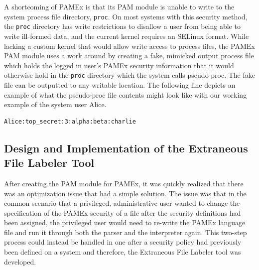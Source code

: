 A shortcoming of PAMEx is that 
its PAM module is unable to write to the system process file directory, 
\texttt{proc}. On most systems with this security method, the \texttt{proc} directory 
has write restrictions to disallow a user from being able to write ill-formed data,
and the current kernel requires an SELinux format. While lacking a custom kernel 
that would allow write access to process files, the PAMEx PAM module 
uses a work around by creating a fake, mimicked output process file 
which holds the logged in user’s PAMEx security information that it 
would otherwise hold in the \texttt{proc} directory which the system calls 
pseudo-proc. The fake file can be outputted to any writable location. 
The following line depicts an example of what the pseudo-proc file contents might look like with our 
working example of the system user Alice. 

\begin{verbatim}
Alice:top_secret:3:alpha:beta:charlie
\end{verbatim}

\vspace{\baselineskip}

\subsection{Design and Implementation of the Extraneous File Labeler Tool}
\par 
\vspace{\baselineskip}
\hspace{1em}
After creating the PAM module for PAMEx, it was quickly realized 
that there was an optimization issue that had a simple solution. The 
issue was that in the common scenario that a privileged, administrative 
user wanted to change the specification of the PAMEx security of a file 
after the security definitions had been assigned, the privileged user 
would need to re-write the PAMEx language file and run it through both 
the parser and the interpreter again. This two-step process could 
instead be handled in one after a security policy had previously been defined on a system and 
therefore, the Extraneous File Labeler tool was developed.  

